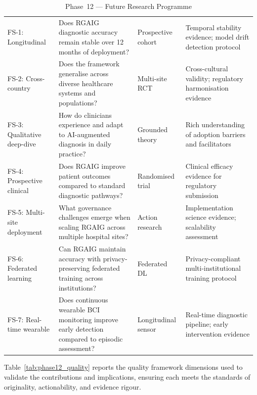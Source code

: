 \begingroup\singlespacing\tablefontsize\tablestripes
\begin{xltabular}{\textwidth}{@{} l X l X @{}}
\caption{Phase~12 --- Future Research Programme}
\label{tab:phase12_future}\\
\toprule
{} &  &  &  \\
\midrule
\endfirsthead
\endhead
\bottomrule
\endlastfoot
FS-1: Longitudinal           & Does RGAIG diagnostic accuracy remain stable over 12 months of deployment?                      & Prospective cohort  & Temporal stability evidence; model drift detection protocol \\
\addlinespace
FS-2: Cross-country          & Does the framework generalise across diverse healthcare systems and populations?                 & Multi-site RCT      & Cross-cultural validity; regulatory harmonisation evidence \\
\addlinespace
FS-3: Qualitative deep-dive  & How do clinicians experience and adapt to AI-augmented diagnosis in daily practice?              & Grounded theory     & Rich understanding of adoption barriers and facilitators \\
\addlinespace
FS-4: Prospective clinical   & Does RGAIG improve patient outcomes compared to standard diagnostic pathways?                    & Randomised trial    & Clinical efficacy evidence for regulatory submission \\
\addlinespace
FS-5: Multi-site deployment  & What governance challenges emerge when scaling RGAIG across multiple hospital sites?             & Action research     & Implementation science evidence; scalability assessment \\
\addlinespace
FS-6: Federated learning     & Can RGAIG maintain accuracy with privacy-preserving federated training across institutions?      & Federated DL        & Privacy-compliant multi-institutional training protocol \\
\addlinespace
FS-7: Real-time wearable     & Does continuous wearable BCI monitoring improve early detection compared to episodic assessment?  & Longitudinal sensor & Real-time diagnostic pipeline; early intervention evidence \\
\end{xltabular}
\endgroup

\vspace{1.5em}

Table~\ref{tab:phase12_quality} reports the quality framework dimensions used to validate the contributions and implications, ensuring each meets the standards of originality, actionability, and evidence rigour.

